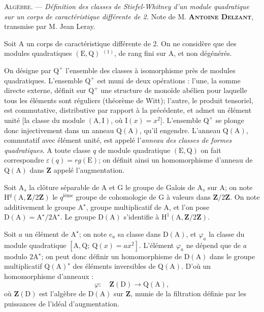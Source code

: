 
\textsc{Algèbre.} --- \textit{Définition des classes de Stiefel-Whitney d'un module
quadratique sur un corps de caractéristique différente de 2.}
Note de M. \textbf{\textsc{Antoine Delzant}}, transmise par M. Jean Leray.

Soit $\mathrm A$ un corps de caractéristique différente de 2. On ne considère que
des modules quadratiques $(\mathrm E,\mathrm Q)$ $^{(1)}$, de rang fini sur $\mathrm A$,
et non dégénérés.

On désigne par $\mathrm Q^+$ l'ensemble des classes à isomorphisme près de modules
quadratiques. L'ensemble $\mathrm Q^+$ est muni de deux opérations : l'une, la somme
directe externe, définit sur $\mathrm Q^+$ une structure de monoïde abélien pour laquelle
tous les éléments sont réguliers (théorème de Witt); l'autre, le produit tensoriel,
est commutative, distributive par rapport à la précédente, et admet un élément unité
[la classe du module $(\mathrm A,\mathrm I)$, où $\mathrm I(x)=x^2$].
L'ensemble $\mathrm Q^+$ se plonge donc injectivement dans un anneau $\mathrm Q(\mathrm A)$,
qu'il engendre. L'anneau $\mathrm Q(\mathrm A)$, commutatif avec élément unité, est appelé
l'\textit{anneau des classes de formes quadratiques}. A toute classe $q$ de module
quadratique $(\mathrm E,\mathrm Q)$ on fait correspondre $\varepsilon(q)=rg(\mathrm E)$;
on définit ainsi un homomorphisme d'anneau de $\mathrm Q(\mathrm A)$ dans $\mathbf Z$
appelé l'augmentation.

Soit $\mathrm A_s$ la clôture séparable de $\mathrm A$ et $\mathrm G$ le groupe de Galois
de $\mathrm A_s$ sur $\mathrm A$; on note $\mathrm H^q(\mathrm A,\mathbf Z/2\mathbf Z)$
le $q^{\text{ième}}$ groupe de cohomologie de $\mathrm G$ à valeurs dans
$\mathbf Z/2\mathbf Z$. On note additivement le groupe $\mathrm A^\star$,
groupe multiplicatif de $\mathrm A$, et l'on pose
$\mathrm D(\mathrm A)=\mathrm A^\star/2\mathrm A^\star$.
Le groupe $\mathrm D(\mathrm A)$ s'identifie à
$\mathrm H^1(\mathrm A,\mathbf Z/2\mathbf Z)$.

Soit $a$ un élément de $\mathrm A^\star$; on note $e_a$ sa classe dans
$\mathrm D(\mathrm A)$, et $\varphi_a$ la classe du module quadratique
$[\mathrm A,\mathrm Q;\ \mathrm Q(x)=ax^2]$.
L'élément $\varphi_a$ ne dépend que de $a$ modulo $2\mathrm A^\star$;
on peut donc définir un homomorphisme de $\mathrm D(\mathrm A)$ dans le groupe
multiplicatif $\mathrm Q(\mathrm A)^\star$ des éléments inversibles de $\mathrm Q(\mathrm A)$.
D'où un homomorphisme d'anneaux :
\[
\varphi:\quad\mathbf Z(\mathrm D)\to\mathrm Q(\mathrm A),
\]
où $\mathbf Z(\mathrm D)$ est l'algèbre de $\mathrm D(\mathrm A)$ sur $\mathbf Z$,
munie de la filtration définie par les puissances de l'idéal d'augmentation.

